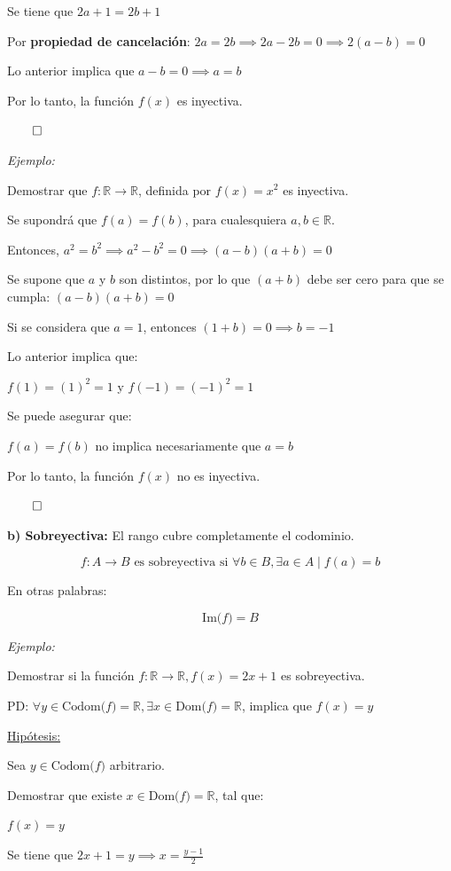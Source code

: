 \documentclass{article}
\begin{document}
Se tiene que $2a + 1 = 2b + 1$

Por \textbf{propiedad de cancelación}: $2a = 2b \implies 2a - 2b = 0 \implies 2(a - b) = 0$

Lo anterior implica que $a - b = 0 \implies a = b$

Por lo tanto, la función $f(x)$ es inyectiva.

$\qed$

\textit{Ejemplo:}

Demostrar que $f: \mathbb{R} \to \mathbb{R}$, definida por $f(x) = x^2$ es inyectiva.

Se supondrá que $f(a) = f(b)$, para cualesquiera $a, b \in \mathbb{R}$.

Entonces, $a^2 = b^2 \implies a^2 - b^2 = 0 \implies (a - b)(a + b) = 0$

Se supone que $a$ y $b$ son distintos, por lo que $(a + b)$ debe ser cero para que se cumpla: $(a - b)(a + b) = 0$

Si se considera que $a = 1$, entonces $(1 + b) = 0 \implies b = -1$

Lo anterior implica que:

$f(1) = (1)^2 = 1$ y $f(-1) = (-1)^2 = 1$

Se puede asegurar que:

$f(a) = f(b)$ no implica necesariamente que $a = b$

Por lo tanto, la función $f(x)$ no es inyectiva.

$\qed$

\textbf{b) Sobreyectiva:} El rango cubre completamente el codominio.
    
\[f: A \to B \text{ es sobreyectiva si } \forall b \in B, \exists a \in A \mid f(a) = b\]

En otras palabras: 

\[\text{Im($f$)} = B\]

\textit{Ejemplo:}

Demostrar si la función $f: \mathbb{R} \to \mathbb{R}, f(x) = 2x + 1$ es sobreyectiva. 

PD: $\forall y \in \text{Codom($f$)} = \mathbb{R}, \exists x \in \text{Dom($f$)} = \mathbb{R}$, implica que $f(x) = y$

\underline{Hipótesis:}

Sea $y \in \text{Codom($f$)}$ arbitrario.

Demostrar que existe $x \in \text{Dom($f$)} = \mathbb{R}$, tal que:

$f(x) = y$

Se tiene que $\displaystyle 2x + 1 = y \implies x = \frac{y - 1}{2}$
\end{document}

